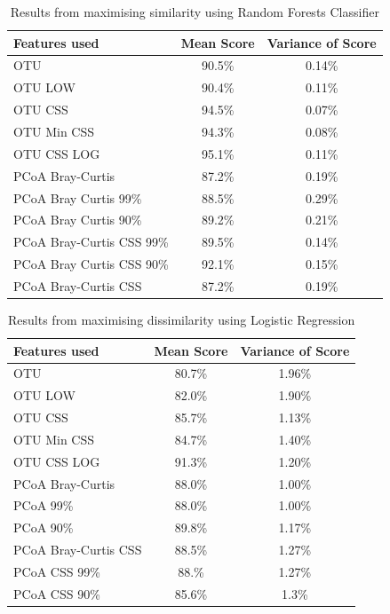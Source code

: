 \begin{table}
	\caption{Results from maximising similarity using Random Forests Classifier}
	\centering
	\label{table:rfrsimilarity}
	\begin{tabular}{l c  c}
		\hline 
		Features used & Mean Score & Variance of Score \\ 
		
		\hline
		OTU & 90.5\% & 0.14\%   \\
		OTU LOW& 90.4\% &0.11\% \\
		OTU CSS & 94.5\% & 0.07\%   \\
		OTU Min CSS & 94.3\% & 0.08\%   \\
		OTU CSS LOG & 95.1\% & 0.11\% \\
		PCoA Bray-Curtis &87.2\% & 0.19\%   \\
		PCoA Bray Curtis 99\%&        88.5\% &0.29\%\\
		PCoA Bray Curtis 90\% &       89.2\%&0.21\%\\
		PCoA Bray-Curtis CSS 99\% &    89.5\%&0.14\%\\
		PCoA Bray Curtis CSS 90\%   & 92.1\% &0.15\%\\
		PCoA Bray-Curtis CSS &87.2\% & 0.19\%   \\
		
		\hline 
	\end{tabular}
\end{table}


\begin{table}[h]
\caption{Results from maximising dissimilarity using Logistic Regression}
\centering
\label{table:lrdissimilarity}
\begin{tabular}{l c  c}
\hline 
Features used & Mean Score & Variance of Score \\ 
 
\hline
OTU & 80.7\% & 1.96\%   \\
OTU LOW &82.0\%&1.90\%\\
OTU CSS & 85.7\% & 1.13\%   \\
OTU Min CSS & 84.7\% & 1.40\%   \\
OTU CSS LOG& 91.3\% &1.20\%\\
PCoA Bray-Curtis &88.0\% & 1.00\%   \\
PCoA 99\%&        88.0\%&1.00\%\\
PCoA 90\% &      89.8\%&1.17\%\\
PCoA Bray-Curtis CSS &88.5\% & 1.27\%   \\
PCoA CSS 99\% &   88.\%&1.27\%\\
PCoA CSS 90\%&    85.6\%&1.3\%\\

\hline 
\end{tabular}
\end{table} 

